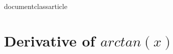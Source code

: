 documentclass{article}
\usepackage{asmath}

\section{Derivative of $arctan(x)$}

\begin{align}

  \end{align}

